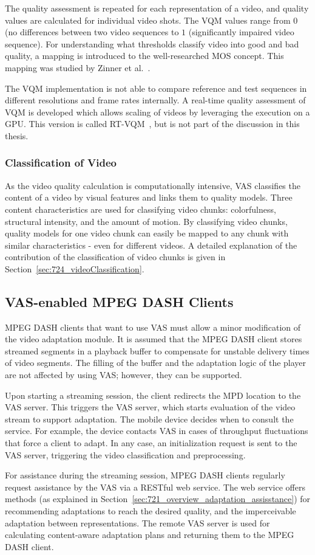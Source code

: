 The quality assessment is repeated for each representation of a video, and quality values are calculated for individual video shots.  
The \ac{VQM} values range from $0$ (no differences between two video sequences to $1$ (significantly impaired video sequence).
For understanding what thresholds classify video into good and bad quality, a mapping is introduced to the well-researched \ac{MOS} concept.
This mapping was studied by Zinner et al.~\cite{Zinner2010}.

The \ac{VQM} implementation is not able to compare reference and test sequences in different resolutions and frame rates internally. 
A real-time quality assessment of \ac{VQM} is developed which allows scaling of videos by leveraging the execution on a \ac{GPU}.
This version is called \ac{RT-VQM}~\cite{Wichtlhuber2016}, but is not part of the discussion in this thesis.
\subsubsection{Classification of Video} 
 As the video quality calculation is computationally intensive, \ac{VAS} classifies the content of a video by visual features and links them to quality models.
Three content characteristics are used for classifying video chunks: colorfulness, structural intensity, and the amount of motion.
 By classifying video chunks, quality models for one video chunk can easily be mapped to any chunk with similar characteristics - even for  different videos.
 A detailed explanation of the contribution of the classification of video chunks is given in Section~\ref{sec:724_videoClassification}.
\subsection{VAS-enabled MPEG DASH Clients}
\label{sec:720_client}
\ac{MPEG} \ac{DASH} clients that want to use \ac{VAS} must allow a minor modification of the video adaptation module.
It is assumed that the \ac{MPEG} \ac{DASH} client stores streamed segments in a playback buffer to compensate for unstable delivery times of video segments.
The filling of the buffer and the adaptation logic of the player are not affected by using \ac{VAS}; however, they can be supported.

Upon starting a streaming session, the client redirects the \ac{MPD} location to the \ac{VAS} server.
This triggers the \ac{VAS} server, which starts evaluation of the video stream to support adaptation. 
The mobile device decides when to consult the service. 
For example, the device contacts \ac{VAS} in cases of throughput fluctuations that force a client to adapt.
In any case, an initialization request is sent to the \ac{VAS} server, triggering the video classification and preprocessing.

For assistance during the streaming session, \ac{MPEG} \ac{DASH} clients regularly request assistance by the \ac{VAS} via a \ac{REST}ful web service.
The web service offers methods (as explained in Section~\ref{sec:721_overview_adaptation_assisstance}) for recommending adaptations to reach the desired quality, and the imperceivable adaptation between representations.
The remote \ac{VAS} server is used for calculating content-aware adaptation plans and returning them to the \ac{MPEG} \ac{DASH} client.
